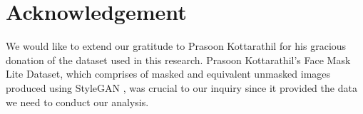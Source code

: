\documentclass{./styles/svproc}
\begin{document}
\section{Acknowledgement}
We would like to extend our gratitude to Prasoon Kottarathil for his gracious donation of the dataset used in this research. Prasoon Kottarathil's Face Mask Lite Dataset, which comprises of masked and equivalent unmasked images produced using StyleGAN \cite{karras2020analyzing}, was crucial to our inquiry since it provided the data we need to conduct our analysis.

\printbibliography
\end{document}
